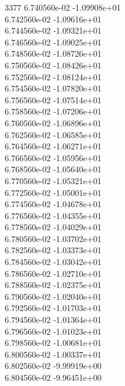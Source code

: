3377	6.740560e-02	-1.09908e+01	\\ 	6.742560e-02	-1.09616e+01	\\ 	6.744560e-02	-1.09321e+01	\\ 	6.746560e-02	-1.09025e+01	\\ 	6.748560e-02	-1.08726e+01	\\ 	6.750560e-02	-1.08426e+01	\\ 	6.752560e-02	-1.08124e+01	\\ 	6.754560e-02	-1.07820e+01	\\ 	6.756560e-02	-1.07514e+01	\\ 	6.758560e-02	-1.07206e+01	\\ 	6.760560e-02	-1.06896e+01	\\ 	6.762560e-02	-1.06585e+01	\\ 	6.764560e-02	-1.06271e+01	\\ 	6.766560e-02	-1.05956e+01	\\ 	6.768560e-02	-1.05640e+01	\\ 	6.770560e-02	-1.05321e+01	\\ 	6.772560e-02	-1.05001e+01	\\ 	6.774560e-02	-1.04678e+01	\\ 	6.776560e-02	-1.04355e+01	\\ 	6.778560e-02	-1.04029e+01	\\ 	6.780560e-02	-1.03702e+01	\\ 	6.782560e-02	-1.03373e+01	\\ 	6.784560e-02	-1.03042e+01	\\ 	6.786560e-02	-1.02710e+01	\\ 	6.788560e-02	-1.02375e+01	\\ 	6.790560e-02	-1.02040e+01	\\ 	6.792560e-02	-1.01703e+01	\\ 	6.794560e-02	-1.01364e+01	\\ 	6.796560e-02	-1.01023e+01	\\ 	6.798560e-02	-1.00681e+01	\\ 	6.800560e-02	-1.00337e+01	\\ 	6.802560e-02	-9.99919e+00	\\ 	6.804560e-02	-9.96451e+00	\\ \hline
